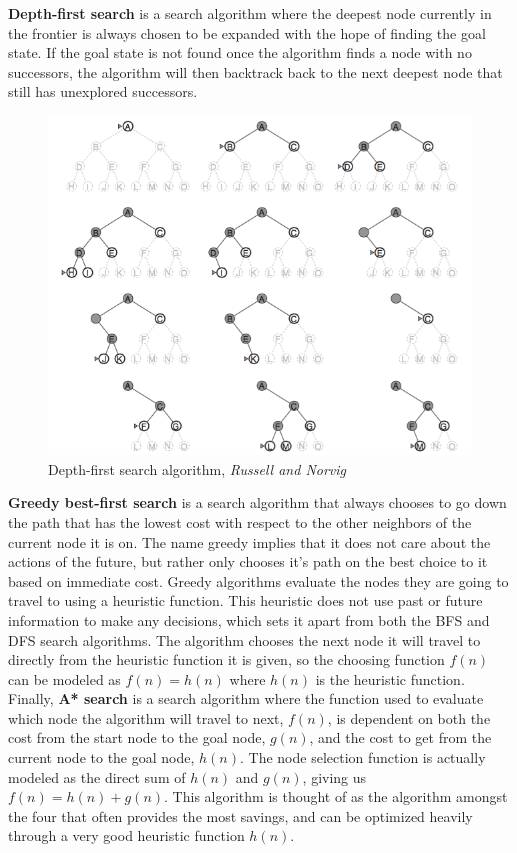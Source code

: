 \documentclass[titlepage]{article}
\begin{document}
\noindent
\textbf{Depth-first search} is a search algorithm where the deepest node currently in the frontier is always chosen to be expanded with the hope of finding the goal state. If the goal state is not found once the algorithm finds a node with no successors, the algorithm will then backtrack back to the next deepest node that still has unexplored successors.

\newpage

\begin{figure}[h!]
\includegraphics[width=\linewidth]{dfs.png}
\caption{Depth-first search algorithm, \textit{Russell and Norvig}}
\label{fig:DFSdiagram1}
\end{figure}

\noindent
\textbf{Greedy best-first search} is a search algorithm that always chooses to go down the path that has the lowest cost with respect to the other neighbors of the current node it is on. The name greedy implies that it does not care about the actions of the future, but rather only chooses it's path on the best choice to it based on immediate cost. Greedy algorithms evaluate the nodes they are going to travel to using a heuristic function. This heuristic does not use past or future information to make any decisions, which sets it apart from both the BFS and DFS search algorithms. The algorithm chooses the next node it will travel to directly from the heuristic function it is given, so the choosing function \(f(n)\) can be modeled as \(f(n) = h(n)\) where \(h(n)\) is the heuristic function.\newline
\newline
Finally, \textbf{A* search} is a search algorithm where the function used to evaluate which node the algorithm will travel to next, \(f(n)\), is dependent on both the cost from the start node to the goal node, \(g(n)\), and the cost to get from the current node to the goal node, \(h(n)\). The node selection function is actually modeled as the direct sum of \(h(n)\) and \(g(n)\), giving us \(f(n) = h(n) + g(n)\). This algorithm is thought of as the algorithm amongst the four that often provides the most savings, and can be optimized heavily through a very good heuristic function \(h(n)\).
\end{document}
